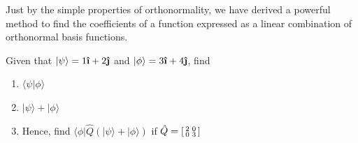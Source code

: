 Just by the simple properties of orthonormality, we have derived a powerful method to find the coefficients of a function expressed as a linear combination of orthonormal basis functions.
\begin{problem}[1]
  Given that \(|\psi\rangle=1\ihat+2\jhat\) and \(|\phi\rangle=3\ihat+4\jhat\), find
  \begin{enumerate}[label=\alph*)]
    \item{\(\langle\psi|\phi\rangle\)}
    \item{\(|\psi\rangle+|\phi\rangle\)}
    \item{Hence, find \(\langle\phi|\hat{Q}(|\psi\rangle+|\phi\rangle)\) if \(\hat{Q}=\begin{bsmallmatrix}
      2 & 0 \\
      0 & 3
    \end{bsmallmatrix}\)}
  \end{enumerate}
\end{problem}

  
